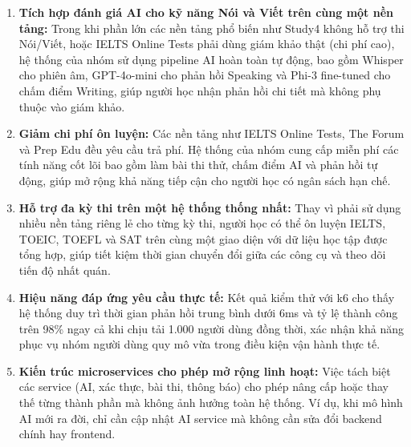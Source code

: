 \begin{enumerate}
    \item \textbf{Tích hợp đánh giá AI cho kỹ năng Nói và Viết trên cùng một nền tảng:} Trong khi phần lớn các nền tảng phổ biến như Study4 không hỗ trợ thi Nói/Viết, hoặc IELTS Online Tests phải dùng giám khảo thật (chi phí cao), hệ thống của nhóm sử dụng pipeline AI hoàn toàn tự động, bao gồm Whisper cho phiên âm, GPT-4o-mini cho phản hồi Speaking và Phi-3 fine-tuned cho chấm điểm Writing, giúp người học nhận phản hồi chi tiết mà không phụ thuộc vào giám khảo.

    \item \textbf{Giảm chi phí ôn luyện:} Các nền tảng như IELTS Online Tests, The Forum và Prep Edu đều yêu cầu trả phí. Hệ thống của nhóm cung cấp miễn phí các tính năng cốt lõi bao gồm làm bài thi thử, chấm điểm AI và phản hồi tự động, giúp mở rộng khả năng tiếp cận cho người học có ngân sách hạn chế.

    \item \textbf{Hỗ trợ đa kỳ thi trên một hệ thống thống nhất:} Thay vì phải sử dụng nhiều nền tảng riêng lẻ cho từng kỳ thi, người học có thể ôn luyện IELTS, TOEIC, TOEFL và SAT trên cùng một giao diện với dữ liệu học tập được tổng hợp, giúp tiết kiệm thời gian chuyển đổi giữa các công cụ và theo dõi tiến độ nhất quán.

    \item \textbf{Hiệu năng đáp ứng yêu cầu thực tế:} Kết quả kiểm thử với k6 cho thấy hệ thống duy trì thời gian phản hồi trung bình dưới 6ms và tỷ lệ thành công trên 98\% ngay cả khi chịu tải 1.000 người dùng đồng thời, xác nhận khả năng phục vụ nhóm người dùng quy mô vừa trong điều kiện vận hành thực tế.

    \item \textbf{Kiến trúc microservices cho phép mở rộng linh hoạt:} Việc tách biệt các service (AI, xác thực, bài thi, thông báo) cho phép nâng cấp hoặc thay thế từng thành phần mà không ảnh hưởng toàn hệ thống. Ví dụ, khi mô hình AI mới ra đời, chỉ cần cập nhật AI service mà không cần sửa đổi backend chính hay frontend.
\end{enumerate}


